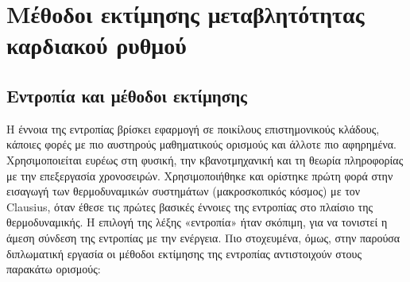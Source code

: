 \section{Μέθοδοι εκτίμησης μεταβλητότητας καρδιακού ρυθμού}
\subsection{Εντροπία και μέθοδοι εκτίμησης}
Η έννοια της εντροπίας βρίσκει εφαρμογή σε ποικίλους επιστημονικούς κλάδους, κάποιες φορές με πιο αυστηρούς μαθηματικούς ορισμούς και άλλοτε πιο αφηρημένα. Χρησιμοποιείται ευρέως στη φυσική, την κβανοτμηχανική και τη θεωρία πληροφορίας με την επεξεργασία χρονοσειρών. Χρησιμοποιήθηκε και ορίστηκε πρώτη φορά στην εισαγωγή των θερμοδυναμικών συστημάτων (μακροσκοπικός κόσμος) με τον \en Clausius, \gr όταν έθεσε τις πρώτες βασικές έννοιες της εντροπίας στο πλαίσιο της θερμοδυναμικής. Η επιλογή της λέξης «εντροπία» ήταν σκόπιμη, για να τονιστεί η άμεση σύνδεση της εντροπίας με την ενέργεια. Πιο στοχευμένα, όμως, στην παρούσα διπλωματική εργασία οι μέθοδοι εκτίμησης της εντροπίας αντιστοιχούν στους παρακάτω ορισμούς: 
